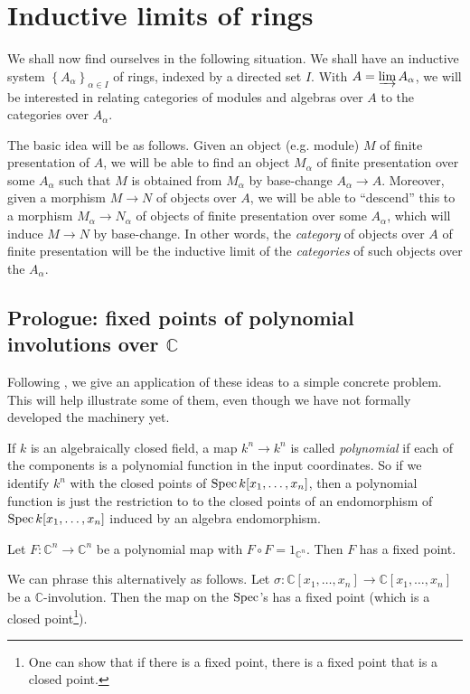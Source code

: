\section{Inductive limits of rings}

We shall now find ourselves in the following situation. We shall have an
inductive system $\left\{A_\alpha\right\}_{\alpha \in I}$ of rings, indexed by a
directed set $I$. With $A = \varinjlim A_\alpha$, we will be interested in relating
categories of modules and algebras over $A$ to the categories over $A_\alpha$.

The basic idea will be as follows. Given an object (e.g. module) $M$ of finite presentation of
$A$, we will be able to find an object $M_\alpha$ of finite presentation over some
$A_\alpha$ such that $M$ is obtained from $M_\alpha$ by base-change $A_\alpha
\to A$. 
Moreover, given a morphism $M \to N$ of objects over $A$, we will be able to
``descend'' this to a morphism $M_\alpha \to N_\alpha$ of objects of finite
presentation over some $A_\alpha$, which will induce $M \to N$ by base-change.
In other words, the \emph{category} of objects over $A$ of finite presentation
will be the inductive limit of the \emph{categories} of such objects over the
$A_\alpha$.

\subsection{Prologue: fixed points of polynomial involutions over $\mathbb{C}$}

Following \cite{Se09}, we give an application of these ideas to a simple
concrete problem. This will help illustrate some of them, even though we have
not formally developed the machinery yet.


If $k$ is an algebraically closed field, a map $k^n \to k^n$ is called \emph{polynomial} if each of
the components is a polynomial function in the input coordinates. 
So if we identify $k^n $ with the closed points of $\operatorname{Spec}
k[x_1, \dots, x_n]$, then a polynomial function is just the
restriction to to the closed points of an endomorphism of $\operatorname{Spec}
k[x_1, \dots, x_n]$ induced by an algebra endomorphism.

\begin{theorem} 
Let $F: \mathbb{C}^n \to \mathbb{C}^n$ be a polynomial map with $F \circ F =
1_{\mathbb{C}^n}$. Then $F$ has a fixed point.
\end{theorem} 

We can phrase this alternatively as follows. Let $\sigma: \mathbb{C}[x_1,
\dots, x_n] \to \mathbb{C}[x_1, \dots, x_n]$ be a $\mathbb{C}$-involution.
Then the map on the $\operatorname{Spec}$'s has a fixed point (which is a closed
point\footnote{One can show that if there is a fixed point, there is a fixed
point that is a closed point.}).


